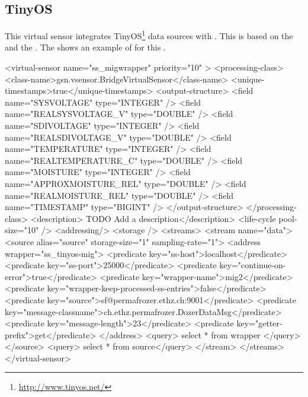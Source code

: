 \subsection{TinyOS \vs \label{quickref_tinyos_vs}}

This virtual sensor integrates TinyOS\footnote{\url{http://www.tinyos.net/}} data sources with \gsn.
This \vs is based on the  \vsp and the  \wrapper.
The  shows an example of \vsd for this \vs.

\begin{xmlcode}[caption={Sample of VSD}, label=listing:xml:tinyos_vsd]
<virtual-sensor name="ss_migwrapper" priority="10" >
    <processing-class>
       <class-name>gsn.vsensor.BridgeVirtualSensor</class-name>
       <unique-timestamps>true</unique-timestamps>
        <output-structure>
			<field name="SYSVOLTAGE" type="INTEGER" />
			<field name="REALSYSVOLTAGE_V" type="DOUBLE" />
			<field name="SDIVOLTAGE" type="INTEGER" />
			<field name="REALSDIVOLTAGE_V" type="DOUBLE" />
			<field name="TEMPERATURE" type="INTEGER" />
			<field name="REALTEMPERATURE_C" type="DOUBLE" />
			<field name="MOISTURE" type="INTEGER" />
			<field name="APPROXMOISTURE_REL" type="DOUBLE" />
			<field name="REALMOISTURE_REL" type="DOUBLE" />
			<field name="TIMESTAMP" type="BIGINT" />
       </output-structure>
    </processing-class>
    <description> TODO Add a description</description>
    <life-cycle pool-size="10" />
    <addressing/>
    <storage />
    <streams>
    <stream name="data">
      <source alias="source" storage-size="1" sampling-rate="1">
        <address wrapper="ss_tinyos-mig">
           		<predicate key="ss-host">localhost</predicate>
          		<predicate key="ss-port">25000</predicate>
          		<predicate key="continue-on-error">true</predicate>
          		<predicate key="wrapper-name">mig2</predicate>
          		<predicate key="wrapper-keep-processed-ss-entries">false</predicate>
               <predicate key="source">sf@permafrozer.ethz.ch:9001</predicate>
               <predicate key="message-classname">ch.ethz.permafrozer.DozerDataMsg</predicate>
               <predicate key="message-length">23</predicate>
               <predicate key="getter-prefix">get</predicate>
           </address>
        <query> select * from wrapper </query>
      </source>
      <query> select * from source</query>
    </stream>
  </streams>
</virtual-sensor>
\end{xmlcode}